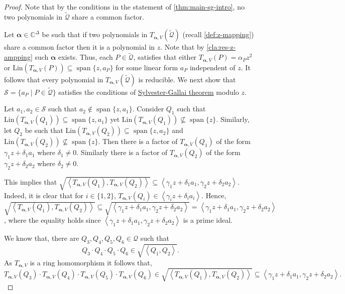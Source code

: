 \documentclass[10pt,a4paper]{article}
\newcommand{\vecalpha}{\boldsymbol{\alpha}}
\newcommand{\vaa}{{\vecalpha}}
\renewcommand{\C}{\mathbb{C}}
\newcommand{\cQ}{{\mathcal{Q}}}
\newcommand{\calS}{{\mathcal{S}}}
\newcommand{\ideal}[1]{\left \langle{#1}\right \rangle}
\newcommand{\spn}[1]{\operatorname{span}\{{#1}\}}
\newcommand{\MS}{\text{Lin}}
\begin{document}
\begin{proof}
	Note that by the conditions  in the statement of \autoref{thm:main-sg-intro}, no two polynomials in $\tilde{\cQ}$ share a common factor.
	
	Let $\vaa\in\C^\Delta$ be such that if two polynomials in $T_{\vaa, V}(\tilde{\cQ})$ (recall \autoref{def:z-mapping}) share a common factor then it is a polynomial in $z$. Note that by \autoref{cla:res-z-ampping} such $\vaa$ exists. Thus, each $P\in \tilde{\cQ}$, satisfies that either $T_{\vaa, V}(P)=\alpha_P z^2$ or $\MS(T_{\vaa, V}(P))\subseteq \spn{z,a_P}$ for some linear form $a_P$ independent of $z$.
	It follows that every polynomial in $T_{\vaa, V}(\tilde{\cQ})$ is reducible. We next show that $\calS = \{a_P \mid P\in \tilde\cQ\}$ satisfies the conditions of \hyperref[thm:SG-linforms]{Sylvester-Gallai theorem} modulo $z$. 
	
	Let $a_1, a_2 \in \calS$ such that $a_2 \notin \spn{z,a_1}$. Consider $Q_1$ such that $\MS(T_{\vaa, V}(Q_1)) \subseteq \spn{z,a_1}$ yet $\MS(T_{\vaa, V}(Q_1)) \not\subseteq \spn{z}$. Similarly, let $Q_2$ be such that $\MS(T_{\vaa, V}(Q_2)) \subseteq \spn{z,a_2}$ and $\MS(T_{\vaa, V}(Q_2)) \not\subseteq \spn{z}$.
	Then there is a factor of $T_{\vaa,V}(Q_1)$ of the form $\gamma_1 z + \delta_1 a_1$ where $\delta_1\neq 0$. Similarly  there is a factor of $T_{\vaa,V}(Q_2)$ of the form $\gamma_2 z + \delta_2 a_2$ where $\delta_2\neq 0$.
	
	This implies that $\sqrt{\ideal{T_{\vaa,V}(Q_1), T_{\vaa,V}(Q_2)}} \subseteq \ideal{\gamma_1 z + \delta_1 a_1, \gamma_2 z + \delta_2 a_2}$. Indeed, it is clear that for $i\in\{1,2\}$, ${T_{\vaa,V}(Q_i)}\in\ideal{\gamma_i z + \delta_i a_i}$. Hence, $\sqrt{\ideal{T_{\vaa,V}(Q_1), T_{\vaa,V}(Q_2)}} \subseteq \sqrt{\ideal{\gamma_1 z + \delta_1 a_1, \gamma_2 z + \delta_2 a_2}}=\ideal{\gamma_1 z + \delta_1 a_1, \gamma_2 z + \delta_2 a_2}$, where the equality holds since $\ideal{\gamma_1 z + \delta_1 a_1, \gamma_2 z + \delta_2 a_2}$ is a prime ideal.
	
	 We know that, there are $Q_3,Q_4,Q_5,Q_6\in \cQ$ such that 
	\[
	Q_3\cdot Q_4\cdot Q_5\cdot Q_6 \in \sqrt{\ideal{Q_1,Q_2}}.
	\] 
	As $T_{\vaa,V}$ is a ring homomorphism it follows that,
	\[
	T_{\vaa,V}(Q_3)\cdot T_{\vaa,V}(Q_4)\cdot T_{\vaa,V}(Q_5)\cdot T_{\vaa,V}(Q_6)\in \sqrt{\ideal{T_{\vaa,V}(Q_1),T_{\vaa,V}(Q_2)}} \subseteq \ideal{\gamma_1 z + \delta_1 a_1, \gamma_2 z + \delta_2 a_2}.
	\] 
	

\end{proof}
\end{document}
